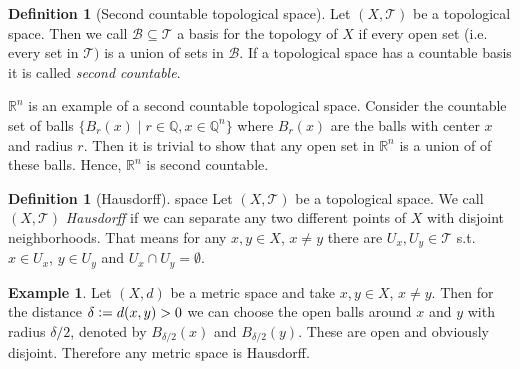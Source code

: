 \documentclass[12pt,a4paper]{article}
\numberwithin{equation}{subsection}
\numberwithin{lemma}{subsection}
\theoremstyle{definition}
\newtheorem{definition}[lemma]{Definition}
\newtheorem{example}[lemma]{Example}
\newcommand{\rational}{\mathbb{Q}}
\newcommand{\real}{\mathbb{R}}
\begin{document}
\begin{definition}[Second countable topological space]
    Let $(X,\mathcal{T})$ be a topological space. Then we call 
    $\mathcal{B}\subseteq \mathcal{T}$ a basis for the topology of $X$ if 
    every open set (i.e. every set in $\mathcal{T})$ is a union of sets 
    in $\mathcal{B}$. If a topological space has a countable basis it is called
    \textit{second countable}.
\end{definition}
$\real^n$ is an example of a second countable topological space. Consider 
the countable set of balls $\{ B_r(x) \mid r \in \rational, x \in \rational^n\}$
where $ B_r(x)$ are the balls with center $x$ and radius $r$.
Then it is trivial to show that any open set in $\real^n$ is a union of 
of these balls. Hence, $\real^n$ is second countable.

\begin{definition}[Hausdorff] space
    Let $(X, \mathcal{T})$ be a topological space. We call $(X, \mathcal{T})$
    \textit{Hausdorff} if we can separate any two different points of $X$
    with disjoint neighborhoods. That means for any $x,y \in X$, 
    $x\neq y$ there are $U_x, U_y \in \mathcal{T}$ s.t. 
    $x \in U_x$, $y \in U_y$ and $U_x \cap U_y = \emptyset$.
\end{definition}

\begin{example}
    Let $(X,d)$ be a metric space and take 
    $x,y \in X$, $x\neq y$. Then for the distance 
    $\delta \vcentcolon= d(x,y) > 0$ we can choose the open balls around $x$ and 
    $y$ with radius 
    $\delta/2$, denoted by $B_{\delta/2}(x)$ and $B_{\delta/2}(y)$. These are 
    open and obviously disjoint. Therefore any metric space is Hausdorff. 
\end{example}
\end{document}
